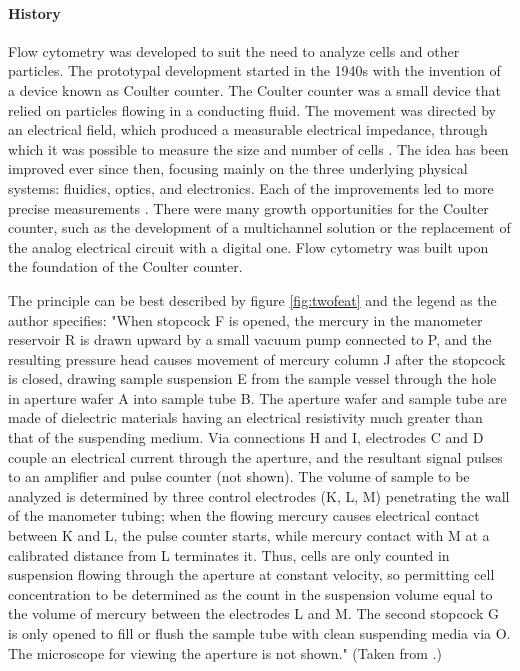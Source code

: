 \paragraph{History}
\label{sec:flowhistory}
Flow cytometry was developed to suit the need to analyze cells and other particles. The prototypal development started in the 1940s with the invention of a device known as Coulter counter. The Coulter counter was a small device that relied on particles flowing in a conducting fluid. The movement was directed by an electrical field, which produced a measurable electrical impedance, through which it was possible to measure the size and number of cells \citealp{graham2013coulter}. The idea has been improved ever since then, focusing mainly on the three underlying physical systems: fluidics, optics, and electronics. Each of the improvements led to more precise measurements \citep{picot2012flow}. There were many growth opportunities for the Coulter counter, such as the development of a multichannel solution or the replacement of the analog electrical circuit with a digital one. Flow cytometry was built upon the foundation of the Coulter counter. 

The principle can be best described by figure \ref{fig:twofeat} and the legend as the author specifies: "When stopcock F is opened,
the mercury in the manometer reservoir R is drawn upward by
a small vacuum pump connected to P, and the resulting pressure
head causes movement of mercury column J after the stopcock is
closed, drawing sample suspension E from the sample vessel
through the hole in aperture wafer A into sample tube B. The
aperture wafer and sample tube are made of dielectric materials
having an electrical resistivity much greater than that of the
suspending medium. Via connections H and I, electrodes C and D
couple an electrical current through the aperture, and the resultant
signal pulses to an amplifier and pulse counter (not shown). The
volume of sample to be analyzed is determined by three control
electrodes (K, L, M) penetrating the wall of the manometer
tubing; when the flowing mercury causes electrical contact between K and L, the pulse counter starts, while mercury contact
with M at a calibrated distance from L terminates it. Thus, cells
are only counted in suspension flowing through the aperture
at constant velocity, so permitting cell concentration to be determined as the count in the suspension volume equal to the
volume of mercury between the electrodes L and M. The second
stopcock G is only opened to fill or flush the sample tube with
clean suspending media via O. The microscope for viewing the
aperture is not shown." (Taken from \cite{don2003coulter}.)

